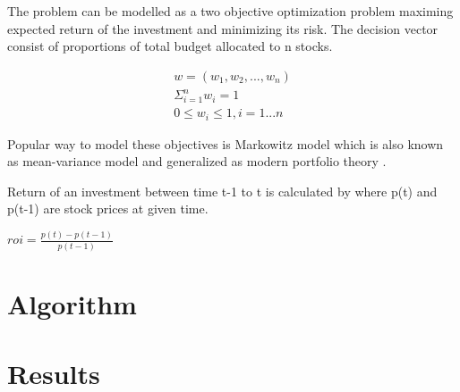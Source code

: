 \documentclass[11pt]{article} %
\begin{document}
The problem can be modelled as a two objective optimization problem maximing expected return of the investment and minimizing its risk. The decision vector consist of proportions of total budget allocated to n stocks.

\begin{equation}
\begin{split}
w = (w_1, w_2, ..., w_n)\\
\Sigma_{i=1}^{n} w_i = 1\\
0 \leq w_i \leq 1, i = 1...n
\end{split}
\end{equation}

Popular way to model these objectives is Markowitz model which is also known as mean-variance model and generalized as modern portfolio theory \cite{kolm201460}.

Return of an investment between time t-1 to t is calculated by where p(t) and p(t-1) are stock prices at given time.

$roi = \frac{p(t) - p(t-1)}{p(t-1)}$


\section{Algorithm}

\section{Results}


\printbibliography %
\end{document}
